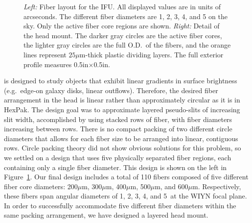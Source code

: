 \begin{figure}[t]
    \vspace{1.5mm}
    \caption[\GP Layout]{\fixspacing \emph{Left:} Fiber layout for the \GP
      IFU.  All displayed values are in units of arcseconds.  The different
      fiber diameters are 1, 2, 3, 4, and
      5 on the sky.  Only the active fiber core regions are shown.
      \emph{Right:} Detail of the \GP head mount.  The darker gray circles
      are the active fiber cores, the lighter gray circles are the full
      O.D.\ of the fibers, and the orange lines represent $25\mu$m-thick
      plastic dividing layers.  The full exterior profile measures
      0.5in$\times$0.5in.
    \label{fig:gradpak}}
\end{figure}


\GP is designed to study objects that exhibit linear gradients in surface
brightness (e.g.\ edge-on galaxy disks, linear outflows).  Therefore, the
desired fiber arrangement in the head is linear rather than approximately
circular as it is in HexPak.  The design goal was to approximate layered
pseudo-slits of increasing slit width, accomplished by using stacked rows of
fiber, with fiber diameters increasing between rows.  There is no compact
packing of two different circle diameters that allows for each fiber size to
be arranged into linear, contiguous rows.  Circle packing theory did not show
obvious solutions for this problem, so we settled on a design that uses five
physically separated fiber regions, each containing only a single fiber
diameter.  This design is shown on the left in Figure~\ref{fig:gradpak}.  Our
final design includes a total of 110 fibers composed of five different fiber
core diameters: 200$\mu$m, 300$\mu$m, 400$\mu$m, 500$\mu$m, and 600$\mu$m.
Respectively, these fibers span angular diameters of 1, 2,
3, 4, and 5\ at the WIYN focal plane.  In order to
successfully accommodate five different fiber diameters within the same
packing arrangement, we have designed a layered head mount.


